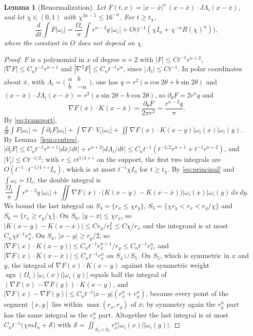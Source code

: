 \documentclass[11pt]{article}
\newtheorem{lemma}{Lemma}
\theoremstyle{definition}
\begin{document}
\begin{lemma}[Renormalization]\label{lem:renormalization}
Let $F(t, x) = |x - \bar x|^n\,(x - \bar x)\cdot J\Lambda_i(x - \bar x)$, and let $\chi \in (0, 1)$ with $\chi^{3n-5} \le 16^{-n}$. For $t \ge t_\chi$,
\[
  \frac{d}{dt}\int F|\omega_i| = \frac{\Omega_i}{\pi}\int r^{n-2}q\,|\omega_i| + O\bigl(t^{-1}(\chi I_n + \chi^{-n}R(\chi)^n)\bigr),
\]
where the constant in $O$ does not depend on $\chi$.
\end{lemma}

\begin{proof}
$F$ is a polynomial in $x$ of degree $n + 2$ with $|F| \le Ct^{-1}r^{n+2}$, $|\nabla F| \le C_nt^{-1}r^{n+1}$ and $|\nabla^2F| \le C_nt^{-1}r^n$, since $|\Lambda_i| \le Ct^{-1}$. In polar coordinates about $\bar x$, with $\Lambda_i = \bigl(\begin{smallmatrix}a & b\\ b & -a\end{smallmatrix}\bigr)$, one has $q = r^2(a\cos2\theta + b\sin2\theta)$ and $(x - \bar x)\cdot J\Lambda_i(x - \bar x) = r^2(a\sin2\theta - b\cos2\theta)$, so $\partial_\theta F = 2r^nq$ and
\begin{equation}\label{eq:principal}
  \nabla F(x)\cdot K(x - \bar x) = \frac{\partial_\theta F}{2\pi r^2} = \frac{r^{n-2}q}{\pi}.
\end{equation}
By \eqref{eq:transport}, $\frac{d}{dt}\int F|\omega_i| = \int\partial_tF|\omega_i| + \int\nabla F\cdot V_i|\omega_i| + \iint\nabla F(x)\cdot K(x - y)|\omega_i(x)|\omega_i(y)$. By Lemma~\ref{lem:centres}, $|\partial_tF| \le C_nt^{-1}r^{n+1}|d\bar x/dt| + r^{n+2}|d\Lambda_i/dt| \le C_nt^{-1}(t^{-1/2}r^{n+1} + t^{-1}r^{n+2})$, and $|V_i| \le Ct^{-1/2}$; with $r \le \varepsilon t^{1/4+\varepsilon}$ on the support, the first two integrals are $O(t^{-1}\cdot t^{-1/4+\varepsilon}I_n)$, which is at most $t^{-1}\chi I_n$ for $t \ge t_\chi$. By \eqref{eq:principal} and $\int\omega_i = \Omega_i$, the double integral is
\[
  \frac{\Omega_i}{\pi}\int r^{n-2}q\,|\omega_i| + \iint\nabla F(x)\cdot\bigl(K(x - y) - K(x - \bar x)\bigr)|\omega_i(x)|\omega_i(y)\,dx\,dy.
\]
We bound the last integral on $S_4 = \{r_x \le \chi r_y\}$, $S_5 = \{\chi r_y < r_x < r_y/\chi\}$ and $S_6 = \{r_x \ge r_y/\chi\}$. On $S_6$, $|y - \bar x| \le \chi r_x$, so $|K(x - y) - K(x - \bar x)| \le Cr_y/r_x^2 \le C\chi/r_x$ and the integrand is at most $C_n\chi t^{-1}r_x^n$. On $S_4$, $|x - y| \ge r_y/2$, so $|\nabla F(x)\cdot K(x - y)| \le C_nt^{-1}r_x^{n+1}/r_y \le C_nt^{-1}r_x^n$, and $|\nabla F(x)\cdot K(x - \bar x)| \le C_nt^{-1}r_x^n$ on $S_4 \cup S_5$. On $S_5$, which is symmetric in $x$ and $y$, the integral of $\nabla F(x)\cdot K(x - y)$ against the symmetric weight $\operatorname{sgn}(\Omega_i)|\omega_i(x)||\omega_i(y)|$ equals half the integral of $(\nabla F(x) - \nabla F(y))\cdot K(x - y)$, and $|\nabla F(x) - \nabla F(y)| \le C_nt^{-1}|x - y|(r_x^n + r_y^n)$, because every point of the segment $[x, y]$ lies within $\max(r_x, r_y)$ of $\bar x$; by symmetry again the $r_y^n$ part has the same integral as the $r_x^n$ part. Altogether the last integral is at most $C_nt^{-1}\bigl(\chi mI_n + \mathcal S\bigr)$ with $\mathcal S = \iint_{S_4\cup S_5}r_x^n|\omega_i(x)||\omega_i(y)|$.


\end{proof}
\end{document}
